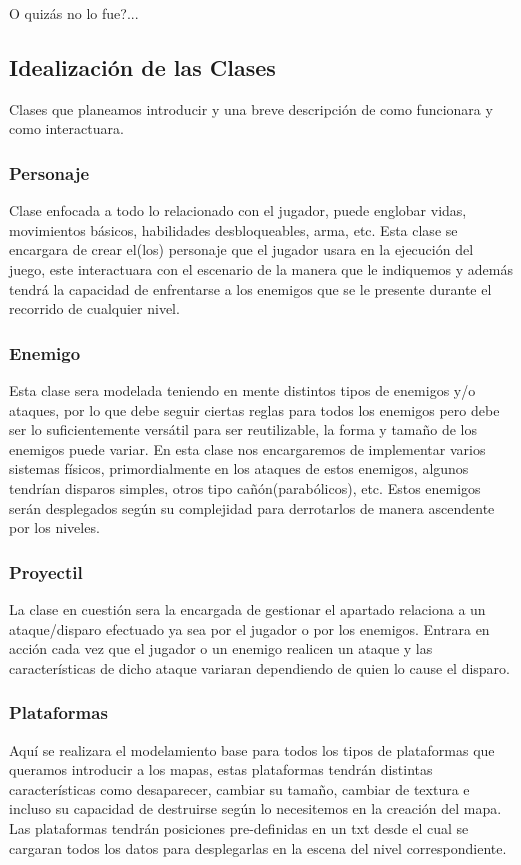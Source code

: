 \documentclass{article}
\begin{document}
        O quizás no lo fue?...
        
        \subsection{Idealización de las Clases}
            Clases que planeamos introducir y una breve descripción de como funcionara y como interactuara.
            
            \subsubsection{Personaje}
            Clase enfocada a todo lo relacionado con el jugador, puede englobar vidas, movimientos básicos, habilidades desbloqueables, arma, etc. Esta clase se encargara de crear el(los) personaje que el jugador usara en la ejecución del juego, este interactuara con el escenario de la manera que le indiquemos y además tendrá la capacidad de enfrentarse a los enemigos que se le presente durante el recorrido de cualquier nivel.
            
            \subsubsection{Enemigo}
            Esta clase sera modelada teniendo en mente distintos tipos de enemigos y/o ataques, por lo que debe seguir ciertas reglas para todos los enemigos pero debe ser lo suficientemente versátil para ser reutilizable, la forma y tamaño de los enemigos puede variar. En esta clase nos encargaremos de implementar varios sistemas físicos, primordialmente en los ataques de estos enemigos, algunos tendrían disparos simples, otros tipo cañón(parabólicos), etc. Estos enemigos serán desplegados según su complejidad para derrotarlos de manera ascendente por los niveles.
            
            \subsubsection{Proyectil}
            La clase en cuestión sera la encargada de gestionar el apartado relaciona a un ataque/disparo efectuado ya sea por el jugador o por los enemigos. Entrara en acción cada vez que el jugador o un enemigo realicen un ataque y las características de dicho ataque variaran dependiendo de quien lo cause el disparo.
            
            \subsubsection{Plataformas}
            Aquí se realizara el modelamiento base para todos los tipos de plataformas que queramos introducir a los mapas, estas plataformas tendrán distintas características como desaparecer, cambiar su tamaño, cambiar de textura e incluso su capacidad de destruirse según lo necesitemos en la creación del mapa. Las plataformas tendrán posiciones pre-definidas en un txt desde el cual se cargaran todos los datos para desplegarlas en la escena del nivel correspondiente.
            
\end{document}
